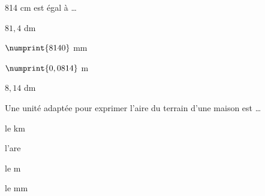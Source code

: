 \begin{QCM}
\begin{GroupeQCM}
    \begin{exercice}
      814 cm est égal à \ldots
      \begin{ChoixQCM}{4}
      \item $81,4$ dm
      \item $\numprint{8140}$ mm
      \item $\numprint{0,0814}$ m
      \item $8,14$ dm
      \end{ChoixQCM}
\begin{corrige}
   \end{corrige}
    \end{exercice}
    
 
    \begin{exercice}
      Une unité adaptée pour exprimer l'aire du terrain d'une maison est \ldots
      \begin{ChoixQCM}{4}
      \item le km
      \item l'are
      \item le m
      \item le mm
      \end{ChoixQCM}
\begin{corrige}
   \end{corrige}
    \end{exercice}

\end{GroupeQCM}
\end{QCM}
   


